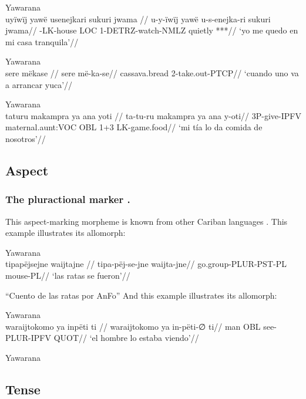 \documentclass{article}
\begin{document}
\ex Yawarana \\
\label{convrisamaj-28}\begingl
\glpreamble  uyïwïj yawë usenejkari sukuri jwama //
\gla u-y-ïwïj yawë u-s-enejka-ri sukuri jwama//
-LK-house LOC 1-DETRZ-watch-NMLZ quietly ***//
\glft ‘yo me quedo en mi casa tranquila’//  
\endgl 
\xe

\ex Yawarana \\
\label{desccasmaj-008}\begingl
\glpreamble  sere mëkase //
\gla sere më-ka-se//
\glb cassava.bread 2-take.out-PTCP//
\glft ‘cuando uno va a arrancar yuca’//  
\endgl 
\xe

\ex Yawarana \\
\label{anfoperso-26}\begingl
\glpreamble  taturu makampra ya ana yoti //
\gla ta-tu-ru makampra ya ana y-oti//
\glb 3P-give-IPFV maternal.aunt:VOC OBL 1+3 LK-game.food//
\glft ‘mi tía lo da comida de nosotros’//  
\endgl 
\xe

\subsection{Aspect}

\subsubsection{The pluractional marker .}

This aspect-marking morpheme is known from other Cariban languages
\parencite{mattiola2020pluractional}. This example illustrates its
 allomorph:

\ex Yawarana \\
\label{ctorat-40}\begingl
\glpreamble  tipapëjsejne waijtajne //
\gla tipa-pëj-se-jne waijta-jne//
\glb go.group-PLUR-PST-PL mouse-PL//
\glft ‘las ratas se fueron’//  
\endgl 
\xe

``Cuento de las ratas por AnFo'' And this example illustrates its
 allomorph:

\ex Yawarana \\
\label{ctorat-32}\begingl
\glpreamble  waraijtokomo ya inpëti ti //
\gla waraijtokomo ya in-pëti-∅ ti//
\glb man OBL see-PLUR-IPFV QUOT//
\glft ‘el hombre lo estaba viendo’//  
\endgl 
\xe

Yawarana

\subsection{Tense}

\subsubsection{}
\end{document}
